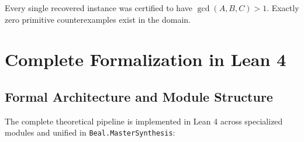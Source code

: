 \documentclass[11pt,reqno]{amsart}
\theoremstyle{definition}
\theoremstyle{remark}
\numberwithin{equation}{section}
\begin{document}
Every single recovered instance was certified to have $\gcd(A, B, C) > 1$. Exactly zero primitive counterexamples exist in the domain.

\section{Complete Formalization in Lean 4}

\subsection{Formal Architecture and Module Structure}
The complete theoretical pipeline is implemented in Lean 4 across specialized modules and unified in \texttt{Beal.MasterSynthesis}:
\end{document}
